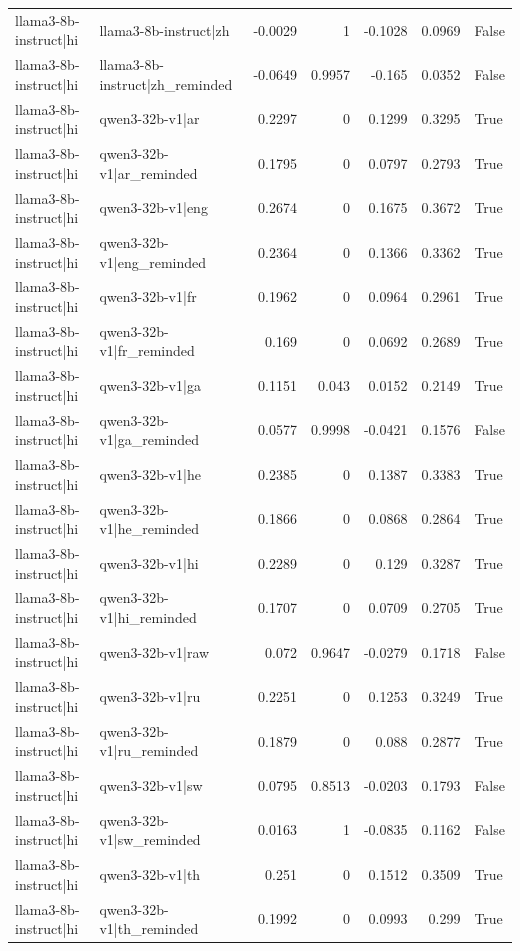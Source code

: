 \begin{table}
\begin{tabular}{l l r r r r l}
llama3-8b-instruct|hi & llama3-8b-instruct|zh & -0.0029 & 1 & -0.1028 & 0.0969 & False \\
llama3-8b-instruct|hi & llama3-8b-instruct|zh_reminded & -0.0649 & 0.9957 & -0.165 & 0.0352 & False \\
llama3-8b-instruct|hi & qwen3-32b-v1|ar & 0.2297 & 0 & 0.1299 & 0.3295 & True \\
llama3-8b-instruct|hi & qwen3-32b-v1|ar_reminded & 0.1795 & 0 & 0.0797 & 0.2793 & True \\
llama3-8b-instruct|hi & qwen3-32b-v1|eng & 0.2674 & 0 & 0.1675 & 0.3672 & True \\
llama3-8b-instruct|hi & qwen3-32b-v1|eng_reminded & 0.2364 & 0 & 0.1366 & 0.3362 & True \\
llama3-8b-instruct|hi & qwen3-32b-v1|fr & 0.1962 & 0 & 0.0964 & 0.2961 & True \\
llama3-8b-instruct|hi & qwen3-32b-v1|fr_reminded & 0.169 & 0 & 0.0692 & 0.2689 & True \\
llama3-8b-instruct|hi & qwen3-32b-v1|ga & 0.1151 & 0.043 & 0.0152 & 0.2149 & True \\
llama3-8b-instruct|hi & qwen3-32b-v1|ga_reminded & 0.0577 & 0.9998 & -0.0421 & 0.1576 & False \\
llama3-8b-instruct|hi & qwen3-32b-v1|he & 0.2385 & 0 & 0.1387 & 0.3383 & True \\
llama3-8b-instruct|hi & qwen3-32b-v1|he_reminded & 0.1866 & 0 & 0.0868 & 0.2864 & True \\
llama3-8b-instruct|hi & qwen3-32b-v1|hi & 0.2289 & 0 & 0.129 & 0.3287 & True \\
llama3-8b-instruct|hi & qwen3-32b-v1|hi_reminded & 0.1707 & 0 & 0.0709 & 0.2705 & True \\
llama3-8b-instruct|hi & qwen3-32b-v1|raw & 0.072 & 0.9647 & -0.0279 & 0.1718 & False \\
llama3-8b-instruct|hi & qwen3-32b-v1|ru & 0.2251 & 0 & 0.1253 & 0.3249 & True \\
llama3-8b-instruct|hi & qwen3-32b-v1|ru_reminded & 0.1879 & 0 & 0.088 & 0.2877 & True \\
llama3-8b-instruct|hi & qwen3-32b-v1|sw & 0.0795 & 0.8513 & -0.0203 & 0.1793 & False \\
llama3-8b-instruct|hi & qwen3-32b-v1|sw_reminded & 0.0163 & 1 & -0.0835 & 0.1162 & False \\
llama3-8b-instruct|hi & qwen3-32b-v1|th & 0.251 & 0 & 0.1512 & 0.3509 & True \\
llama3-8b-instruct|hi & qwen3-32b-v1|th_reminded & 0.1992 & 0 & 0.0993 & 0.299 & True \\

\end{tabular}
\end{table}
